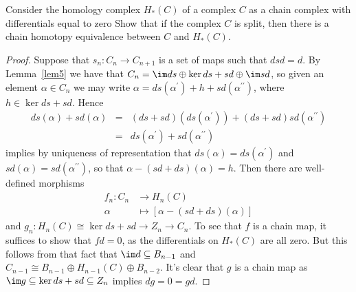 \documentclass[10pt]{amsart}
\begin{document}
\begin{thm}\label{Ex2}
  Consider the homology complex $H_*(C)$ of a complex $C$ as a chain complex with differentials equal to zero
  Show that if the complex $C$ is split, then there is a chain homotopy equivalence between $C$ and $H_*(C)$.

  \begin{proof}
    Suppose that $s_n : C_n \rightarrow C_{n+1}$ is a set of maps such that $dsd = d$.
    By Lemma~\ref{lem5} we have that $C_n = \im ds \oplus \ker ds + sd \oplus \im sd$, so given an element $\alpha \in C_n$ we may write $\alpha = ds(\alpha^\prime) + h + sd(\alpha^{\prime\prime})$, where $h \in \ker ds + sd$.
    Hence
    \begin{eqnarray*}
      ds(\alpha) + sd(\alpha) &=& (ds + sd)(ds(\alpha^\prime)) + (ds + sd) sd(\alpha^{\prime\prime})\\
      &=& ds(\alpha^\prime) + sd(\alpha^{\prime\prime})
    \end{eqnarray*}
    implies by uniqueness of representation that $ds(\alpha) = ds(\alpha^\prime)$ and $sd(\alpha) = sd(\alpha^{\prime\prime})$, so that $\alpha - (sd + ds)(\alpha) = h$.
    Then there are well-defined morphisms
    \begin{align*}
      f_n \colon C_n &\rightarrow H_n(C)\\
      \alpha &\mapsto [\alpha - (sd + ds)(\alpha)]
    \end{align*}
    and
    $g_n : H_n(C) \cong \ker ds + sd \rightarrow Z_n \rightarrow C_n$.
    To see that $f$ is a chain map, it suffices to show that $fd = 0$, as the differentials on $H_*(C)$ are all zero.
    But this follows from that fact that $\im d \subseteq B_{n-1}$ and $C_{n-1} \cong B_{n-1} \oplus H_{n-1}(C) \oplus B_{n-2}$.
    It's clear that $g$ is a chain map as $\im g \subseteq \ker ds + sd \subseteq Z_n$ implies $dg = 0 = gd$.


\end{proof}
\end{thm}
\end{document}
